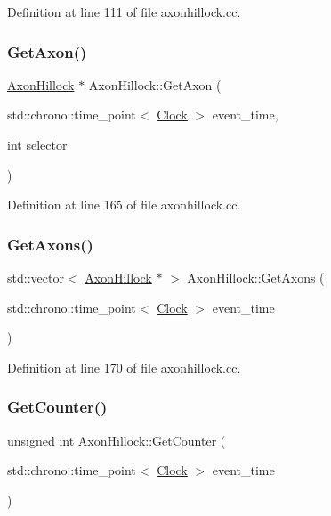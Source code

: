 Definition at line 111 of file axonhillock.\+cc.

\mbox{\label{class_axon_hillock_a08fde7d1b8a40ba7a052315f95b743f0}} 
\subsubsection{\texorpdfstring{Get\+Axon()}{GetAxon()}}
{\footnotesize\ttfamily \mbox{\hyperlink{class_axon_hillock}{Axon\+Hillock}} $\ast$ Axon\+Hillock\+::\+Get\+Axon (\begin{DoxyParamCaption}\item[{std\+::chrono\+::time\+\_\+point$<$ \mbox{\hyperlink{universe_8h_a0ef8d951d1ca5ab3cfaf7ab4c7a6fd80}{Clock}} $>$}]{event\+\_\+time,  }\item[{int}]{selector }\end{DoxyParamCaption})}



Definition at line 165 of file axonhillock.\+cc.

\mbox{\label{class_axon_hillock_af35663768cbe818e092382519a6d73e3}} 
\subsubsection{\texorpdfstring{Get\+Axons()}{GetAxons()}}
{\footnotesize\ttfamily std\+::vector$<$ \mbox{\hyperlink{class_axon_hillock}{Axon\+Hillock}} $\ast$ $>$ Axon\+Hillock\+::\+Get\+Axons (\begin{DoxyParamCaption}\item[{std\+::chrono\+::time\+\_\+point$<$ \mbox{\hyperlink{universe_8h_a0ef8d951d1ca5ab3cfaf7ab4c7a6fd80}{Clock}} $>$}]{event\+\_\+time }\end{DoxyParamCaption})}



Definition at line 170 of file axonhillock.\+cc.

\mbox{\label{class_axon_hillock_a429c9876d679fe8de4533725afc4875c}} 
\subsubsection{\texorpdfstring{Get\+Counter()}{GetCounter()}}
{\footnotesize\ttfamily unsigned int Axon\+Hillock\+::\+Get\+Counter (\begin{DoxyParamCaption}\item[{std\+::chrono\+::time\+\_\+point$<$ \mbox{\hyperlink{universe_8h_a0ef8d951d1ca5ab3cfaf7ab4c7a6fd80}{Clock}} $>$}]{event\+\_\+time }\end{DoxyParamCaption})\hspace{0.3cm}{\ttfamily [inline]}}



